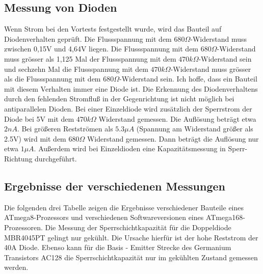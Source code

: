 \subsection{Messung von Dioden}
\label{sec:diode}
Wenn Strom bei den Vortests festgestellt wurde, wird das Bauteil auf Diodenverhalten geprüft.
Die Flussspannung mit dem \(680\Omega\)-Widerstand muss zwischen 0,15V und 4,64V liegen.
Die Flussspannung mit dem \(680\Omega\)-Widerstand muss grösser als 1,125 Mal der Flussspannung mit dem
 \(470k\Omega\)-Widerstand sein und sechzehn Mal die Flussspannung mit dem \(470k\Omega\)-Widerstand muss
grösser als die Flussspannung mit dem \(680\Omega\)-Widerstand sein.
Ich hoffe, dass ein Bauteil mit diesem Verhalten immer eine Diode ist.
Die Erkennung des Diodenverhaltens durch den fehlenden Stromfluß in der Gegenrichtung ist nicht
möglich bei antiparallelen Dioden.
Bei einer Einzeldiode wird zusätzlich der Sperrstrom der Diode bei 5V mit dem \(470k\Omega\) Widerstand
gemessen. Die Auflösung beträgt etwa \(2nA\). Bei größeren Restströmen als \(5.3\mu A\) (Spannung am Widerstand größer als 2.5V) wird
 mit dem \(680\Omega\) Widerstand gemessen. Dann beträgt die Auflösung nur etwa \(1\mu A\).
Außerdem wird bei Einzeldioden eine Kapazitätsmessung in Sperr-Richtung durchgeführt. 

\subsection{Ergebnisse der verschiedenen Messungen}
Die folgenden drei Tabelle zeigen die Ergebnisse verschiedener Bauteile 
eines ATmega8-Prozessors und verschiedenen Softwareversionen eines ATmega168-Prozessoren.
Die Messung der Sperrschichtkapazität für die Doppeldiode MBR4045PT gelingt
nur gekühlt. Die Ursache hierfür ist der hohe Reststrom der 40A Diode. Ebenso kann für die Basis - Emitter
Strecke des Germanium Transistors AC128 die Sperrschichtkapazität nur im
gekühlten Zustand gemessen werden. 

